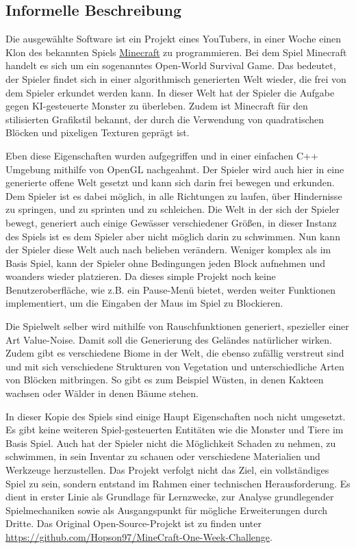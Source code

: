 \documentclass{article}
\begin{document}
\subsection{Informelle Beschreibung} \label{subsec:inf}

Die ausgewählte Software ist ein Projekt eines YouTubers, in einer Woche einen Klon des bekannten Spiels \href{https://www.minecraft.net}{Minecraft} zu programmieren. Bei dem Spiel Minecraft handelt es sich um ein sogenanntes Open-World Survival Game. Das bedeutet, der Spieler findet sich in einer algorithmisch generierten Welt wieder, die frei von dem Spieler erkundet werden kann. In dieser Welt hat der Spieler die Aufgabe gegen KI-gesteuerte Monster zu überleben. Zudem ist Minecraft für den stilisierten Grafikstil bekannt, der durch die Verwendung von quadratischen Blöcken und pixeligen Texturen geprägt ist.

Eben diese Eigenschaften wurden aufgegriffen und in einer einfachen C++ Umgebung mithilfe von OpenGL nachgeahmt. Der Spieler wird auch hier in eine generierte offene Welt gesetzt und kann sich darin frei bewegen und erkunden. Dem Spieler ist es dabei möglich, in alle Richtungen zu laufen, über Hindernisse zu springen, und zu sprinten und zu schleichen. Die Welt in der sich der Spieler bewegt, generiert auch einige Gewässer verschiedener Grö\ss{}en, in dieser Instanz des Spiels ist es dem Spieler aber nicht möglich darin zu schwimmen. Nun kann der Spieler diese Welt auch nach belieben verändern. Weniger komplex als im Basis Spiel, kann der Spieler ohne Bedingungen jeden Block aufnehmen und woanders wieder platzieren. Da dieses simple Projekt noch keine Benutzeroberfläche, wie z.B. ein Pause-Menü bietet, werden weiter Funktionen implementiert, um die Eingaben der Maus im Spiel zu Blockieren.

Die Spielwelt selber wird mithilfe von Rauschfunktionen generiert, spezieller einer Art Value-Noise. Damit soll die Generierung des Geländes natürlicher wirken. Zudem gibt es verschiedene Biome in der Welt, die ebenso zufällig verstreut sind und mit sich verschiedene Strukturen von Vegetation und unterschiedliche Arten von Blöcken mitbringen. So gibt es zum Beispiel Wüsten, in denen Kakteen wachsen oder Wälder in denen Bäume stehen.

In dieser Kopie des Spiels sind einige Haupt Eigenschaften noch nicht umgesetzt. Es gibt keine weiteren Spiel-gesteuerten Entitäten wie die Monster und Tiere im Basis Spiel. Auch hat der Spieler nicht die Möglichkeit Schaden zu nehmen, zu schwimmen, in sein Inventar zu schauen oder verschiedene Materialien und Werkzeuge herzustellen. Das Projekt verfolgt nicht das Ziel, ein vollständiges Spiel zu sein, sondern entstand im Rahmen einer technischen Herausforderung. Es dient in erster Linie als Grundlage für Lernzwecke, zur Analyse grundlegender Spielmechaniken sowie als Ausgangspunkt für mögliche Erweiterungen durch Dritte. Das Original Open-Source-Projekt ist zu finden unter \url{https://github.com/Hopson97/MineCraft-One-Week-Challenge}.
\end{document}
